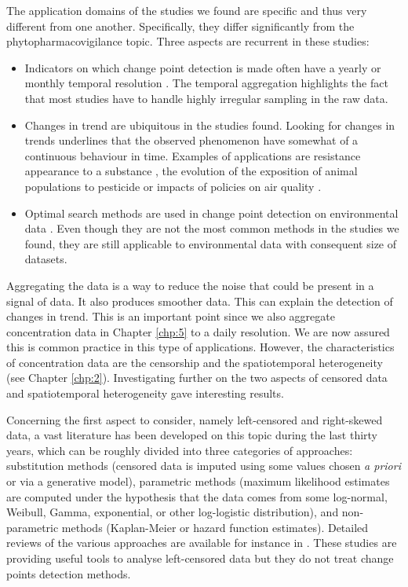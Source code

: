The application domains of the studies we found are specific and thus very different from one another. Specifically, they differ significantly from the phytopharmacovigilance topic. Three aspects are recurrent in these studies: 
\begin{itemize}
\item Indicators on which change point detection is made often have a yearly or monthly temporal resolution \citep{Ko2017,Ryberg2020,FOMBY2006}. The temporal aggregation highlights the fact that most studies have to handle highly irregular sampling in the raw data. 
\item Changes in trend are ubiquitous in the studies found. Looking for changes in trends underlines that the observed phenomenon have somewhat of a continuous behaviour in time. Examples of applications are resistance appearance to a substance \citep{Solla2010}, the evolution of the exposition of animal populations to pesticide \citep{Menger2022} or impacts of policies on air quality \citep{FOMBY2006}.
\item Optimal search methods are used in change point detection on environmental data \citep{BUNCE_2018,Ryberg2020}. Even though they are not the most common methods in the studies we found, they are still applicable to environmental data with consequent size of datasets. \end{itemize}

Aggregating the data is a way to reduce the noise that could be present in a signal of data. It also produces smoother data. This can explain the detection of changes in trend. This is an important point since we also aggregate concentration data in Chapter \ref{chp:5} to a daily resolution. We are now assured this is common practice in this type of applications. 
However, the characteristics of concentration data are the censorship and the spatiotemporal heterogeneity (see Chapter \ref{chp:2}).
Investigating further on the two aspects of censored data and spatiotemporal heterogeneity gave interesting results. 

Concerning the first aspect to consider, namely left-censored and right-skewed data, a vast literature has been developed on this topic during the last thirty years, which can be roughly divided into three categories of approaches: substitution methods (censored data is imputed using some values chosen \emph{a priori} or via a generative model), parametric methods (maximum likelihood estimates are computed under the hypothesis that the data comes from some log-normal, Weibull, Gamma, exponential, or other log-logistic distribution), and non-parametric methods (Kaplan-Meier or hazard function estimates). Detailed reviews of the various approaches are available  for instance in \cite{Authority2010,Hewett2007ACO,Mitra2008,Canales2018,Antweiler2008,Gillespie2010,shoari2018toward}. These studies are providing useful tools to analyse left-censored data but they do not treat change points detection methods. 


